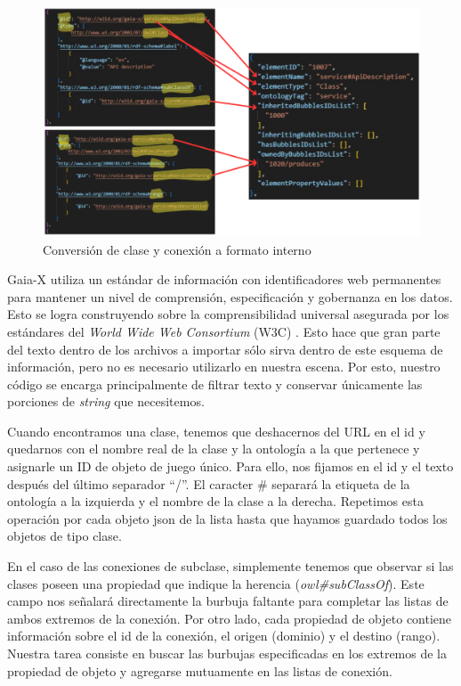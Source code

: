 \begin{figure}[ht]
   \begin{center}
      \includegraphics[width=0.9\linewidth]{chapter2/figures/parser.png}
   \end{center}
   \caption[Conversión de clase y conexión a formato interno]
   {\footnotesize Conversión de clase y conexión a formato interno}
\end{figure}

Gaia-X utiliza un estándar de información con identificadores web permanentes \cite[]{selfDescription} para mantener un nivel de comprensión, especificación y gobernanza en los datos. Esto se logra construyendo sobre la comprensibilidad universal asegurada por los estándares del \textit{World Wide Web Consortium} (W3C) \cite[]{w3id}.
Esto hace que gran parte del texto dentro de los archivos a importar sólo sirva dentro de este esquema de información, pero no es necesario utilizarlo en nuestra escena. Por esto, nuestro código se encarga principalmente de filtrar texto y conservar únicamente las porciones de \textit{string} que necesitemos. 

Cuando encontramos una clase, tenemos que deshacernos del URL en el id y quedarnos con el nombre real de la clase y la ontología a la que pertenece y asignarle un ID de objeto de juego único.
Para ello, nos fijamos en el id y el texto después del último separador ``/''. El caracter \# separará la etiqueta de la ontología a la izquierda y el nombre de la clase a la derecha.
Repetimos esta operación por cada objeto json de la lista hasta que hayamos guardado todos los objetos de tipo clase.

En el caso de las conexiones de subclase, simplemente tenemos que observar si las clases poseen una propiedad que indique la herencia (\textit{owl\#subClassOf}). Este campo nos señalará directamente la burbuja faltante para completar las listas de ambos extremos de la conexión.
Por otro lado, cada propiedad de objeto contiene información sobre el id de la conexión, el origen (dominio) y el destino (rango). Nuestra tarea consiste en buscar las burbujas especificadas en los extremos de la propiedad de objeto y agregarse mutuamente en las listas de conexión.

